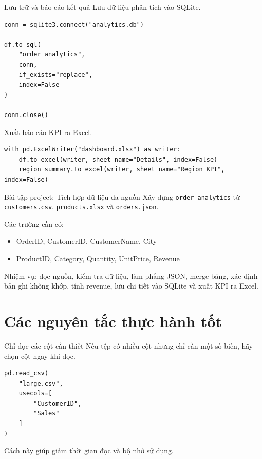 \documentclass[aspectratio=169,11pt]{beamer}
\newcommand{\code}[1]{\texttt{#1}}
\begin{document}
\begin{frame}[fragile]{Lưu trữ và báo cáo kết quả}
Lưu dữ liệu phân tích vào SQLite.
\begin{lstlisting}[style=pythonstyle]
conn = sqlite3.connect("analytics.db")

df.to_sql(
    "order_analytics",
    conn,
    if_exists="replace",
    index=False
)

conn.close()
\end{lstlisting}

Xuất báo cáo KPI ra Excel.
\begin{lstlisting}[style=pythonstyle]
with pd.ExcelWriter("dashboard.xlsx") as writer:
    df.to_excel(writer, sheet_name="Details", index=False)
    region_summary.to_excel(writer, sheet_name="Region_KPI", index=False)
\end{lstlisting}
\end{frame}

\begin{frame}{Bài tập project: Tích hợp dữ liệu đa nguồn}
Xây dựng \code{order\_analytics} từ \code{customers.csv}, \code{products.xlsx} và \code{orders.json}.

Các trường cần có:
\begin{itemize}
  \item OrderID, CustomerID, CustomerName, City
  \item ProductID, Category, Quantity, UnitPrice, Revenue
\end{itemize}

Nhiệm vụ: đọc nguồn, kiểm tra dữ liệu, làm phẳng JSON, merge bảng, xác định bản ghi không khớp, tính revenue, lưu chi tiết vào SQLite và xuất KPI ra Excel.
\end{frame}

\section{Các nguyên tắc thực hành tốt}

\begin{frame}[fragile]{Chỉ đọc các cột cần thiết}
Nếu tệp có nhiều cột nhưng chỉ cần một số biến, hãy chọn cột ngay khi đọc.

\begin{lstlisting}[style=pythonstyle]
pd.read_csv(
    "large.csv",
    usecols=[
        "CustomerID",
        "Sales"
    ]
)
\end{lstlisting}

Cách này giúp giảm thời gian đọc và bộ nhớ sử dụng.
\end{frame}
\end{document}
